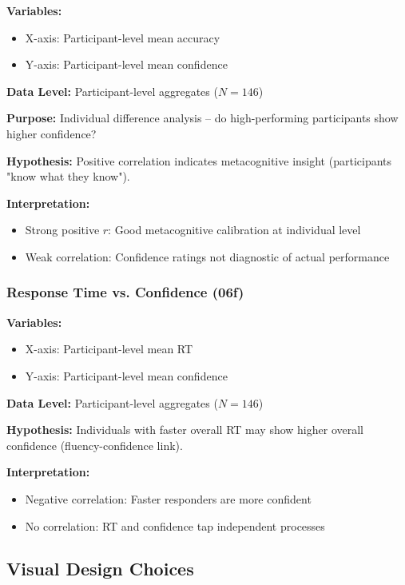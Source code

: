 \documentclass[12pt,a4paper]{article}
\begin{document}
\textbf{Variables:}
\begin{itemize}
    \item X-axis: Participant-level mean accuracy
    \item Y-axis: Participant-level mean confidence
\end{itemize}

\textbf{Data Level:} Participant-level aggregates ($N=146$)

\textbf{Purpose:} Individual difference analysis -- do high-performing participants show higher confidence?

\textbf{Hypothesis:} Positive correlation indicates metacognitive insight (participants "know what they know").

\textbf{Interpretation:}
\begin{itemize}
    \item Strong positive $r$: Good metacognitive calibration at individual level
    \item Weak correlation: Confidence ratings not diagnostic of actual performance
\end{itemize}

\subsubsection{Response Time vs. Confidence (06f)}

\textbf{Variables:}
\begin{itemize}
    \item X-axis: Participant-level mean RT
    \item Y-axis: Participant-level mean confidence
\end{itemize}

\textbf{Data Level:} Participant-level aggregates ($N=146$)

\textbf{Hypothesis:} Individuals with faster overall RT may show higher overall confidence (fluency-confidence link).

\textbf{Interpretation:}
\begin{itemize}
    \item Negative correlation: Faster responders are more confident
    \item No correlation: RT and confidence tap independent processes
\end{itemize}

\subsection{Visual Design Choices}
\end{document}
